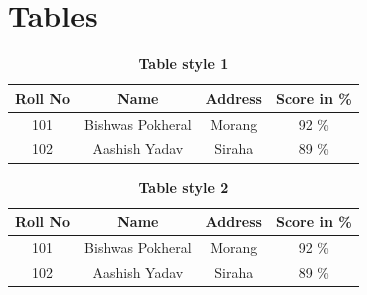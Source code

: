 \documentclass[12pt,a4paper]{report}
\begin{document}
\section{Tables}
\begin{table}[H]%
\centering
    \caption{\textbf{Table style 1}} %
    \vspace{8pt} %
\begin{tabular}{|c|c|c|c|} %
\hline%
\textbf{Roll No} & \textbf{Name} & \textbf{Address} & \textbf{Score in \%} \\ \hline
101 & Bishwas Pokheral & Morang & 92 \%\\ \hline
102 & Aashish Yadav    & Siraha & 89 \%\\ \hline
\end{tabular}
\end{table}
\begin{table}[H]
\centering
    \caption{\textbf{Table style 2}}
    \vspace{8pt} %
\begin{tabular}{cccc} %
\hline%
\textbf{Roll No} & \textbf{Name} & \textbf{Address} & \textbf{Score in \%} \\ \hline
101 & Bishwas Pokheral & Morang & 92 \%\\ 
102 & Aashish Yadav    & Siraha & 89 \%\\ \hline
\end{tabular}
\end{table}
\end{document}
